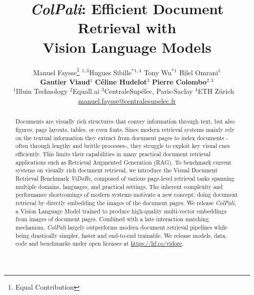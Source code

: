 \documentclass{article} %
\title{\textit{ColPali}: Efficient Document Retrieval with \\ Vision Language Models}
\author{Manuel Faysse\thanks{Equal Contribution} $^{1,3}$\quad Hugues Sibille$^*$$^{1,4}$ \quad Tony Wu$^*$$^{1}$ \quad Bilel Omrani$^{1}$ \\ \textbf{Gautier Viaud}$^{1}$ \quad \textbf{Céline Hudelot}$^{3}$ \quad 
\textbf{Pierre Colombo}$^{2,3}$ \\ $^{1}$Illuin Technology \quad $^2$Equall.ai \quad
$^3$CentraleSupélec, Paris-Saclay \quad $^4$ETH Zürich \,\
\\
\small \url{manuel.faysse@centralesupelec.fr}}
\begin{document}
\maketitle
\begin{abstract}


Documents are visually rich structures that convey information through text, but also figures, page layouts, tables, or even fonts. Since modern retrieval systems mainly rely on the textual information they extract from document pages to index documents -often through lengthy and brittle processes-, they struggle to exploit key visual cues efficiently. This limits their capabilities in many practical document retrieval applications such as Retrieval Augmented Generation (RAG).
To benchmark current systems on visually rich document retrieval, we introduce the Visual Document Retrieval Benchmark \textit{ViDoRe}, composed of various page-level retrieval tasks spanning multiple domains, languages, and practical settings. 
The inherent complexity and performance shortcomings of modern systems motivate a new concept; doing document retrieval by directly embedding the images of the document pages. We release \textit{ColPali}, a Vision Language Model trained to produce high-quality multi-vector embeddings from images of document pages. Combined with a late interaction matching mechanism, \textit{ColPali} largely outperforms modern document retrieval pipelines while being drastically simpler, faster and end-to-end trainable. 
We release models, data, code and benchmarks under open licenses at \url{https://hf.co/vidore}.





\end{abstract}
\end{document}
